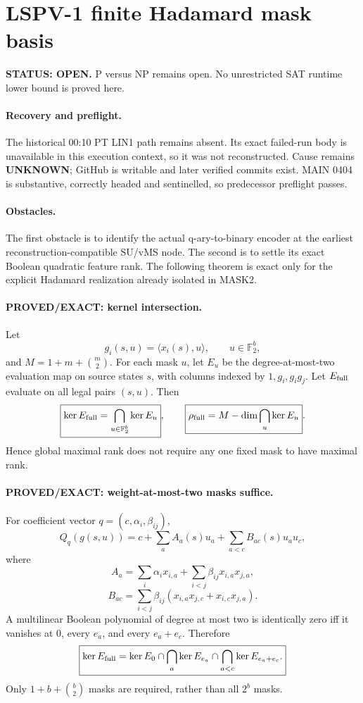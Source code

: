 \documentclass[11pt]{article}
\begin{document}
\section*{LSPV-1 finite Hadamard mask basis}
\textbf{STATUS: OPEN.} P versus NP remains open. No unrestricted SAT runtime lower bound is proved here.

\paragraph{Recovery and preflight.}
The historical 00:10 PT LIN1 path remains absent. Its exact failed-run body is unavailable in this execution context, so it was not reconstructed. Cause remains \textbf{UNKNOWN}; GitHub is writable and later verified commits exist. MAIN 0404 is substantive, correctly headed and sentinelled, so predecessor preflight passes.

\paragraph{Obstacles.}
The first obstacle is to identify the actual q-ary-to-binary encoder at the earliest reconstruction-compatible SU/vMS node. The second is to settle its exact Boolean quadratic feature rank. The following theorem is exact only for the explicit Hadamard realization already isolated in MASK2.

\paragraph{PROVED/EXACT: kernel intersection.}
Let
\[
g_i(s,u)=\langle x_i(s),u\rangle,\qquad u\in\mathbb F_2^b,
\]
and $M=1+m+\binom m2$. For each mask $u$, let $E_u$ be the degree-at-most-two evaluation map on source states $s$, with columns indexed by $1,g_i,g_ig_j$. Let $E_{\rm full}$ evaluate on all legal pairs $(s,u)$. Then
\[
\boxed{\ker E_{\rm full}=\bigcap_{u\in\mathbb F_2^b}\ker E_u},
\qquad
\boxed{\rho_{\rm full}=M-\dim\bigcap_u\ker E_u}.
\]
Hence global maximal rank does not require any one fixed mask to have maximal rank.

\paragraph{PROVED/EXACT: weight-at-most-two masks suffice.}
For coefficient vector $q=(c,\alpha_i,\beta_{ij})$,
\[
Q_q(g(s,u))=c+\sum_a A_a(s)u_a+\sum_{a<c}B_{ac}(s)u_au_c,
\]
where
\[
A_a=\sum_i\alpha_i x_{i,a}+\sum_{i<j}\beta_{ij}x_{i,a}x_{j,a},
\]
\[
B_{ac}=\sum_{i<j}\beta_{ij}(x_{i,a}x_{j,c}+x_{i,c}x_{j,a}).
\]
A multilinear Boolean polynomial of degree at most two is identically zero iff it vanishes at $0$, every $e_a$, and every $e_a+e_c$. Therefore
\[
\boxed{
\ker E_{\rm full}
=
\ker E_0\cap\bigcap_a\ker E_{e_a}\cap\bigcap_{a<c}\ker E_{e_a+e_c}.
}
\]
Only $1+b+\binom b2$ masks are required, rather than all $2^b$ masks.
\end{document}
